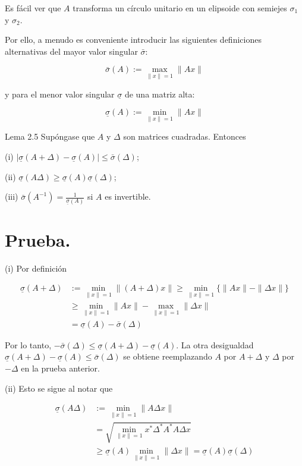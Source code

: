 \documentclass[11pt]{article}
\begin{document}
Es fácil ver que $A$ transforma un círculo unitario en un elipsoide con semiejes $\sigma_{1}$ y $\sigma_{2}$.

Por ello, a menudo es conveniente introducir las siguientes definiciones alternativas del mayor valor singular $\bar{\sigma}$:

$$
\bar{\sigma}(A):=\max _{\|x\|=1}\|A x\|
$$

y para el menor valor singular $\underline{\sigma}$ de una matriz alta:

$$
\underline{\sigma}(A):=\min _{\|x\|=1}\|A x\|
$$

Lema 2.5 Supóngase que $A$ y $\Delta$ son matrices cuadradas. Entonces

(i) $|\underline{\sigma}(A+\Delta)-\underline{\sigma}(A)| \leq \bar{\sigma}(\Delta)$;

(ii) $\underline{\sigma}(A \Delta) \geq \underline{\sigma}(A) \underline{\sigma}(\Delta)$;

(iii) $\bar{\sigma}\left(A^{-1}\right)=\frac{1}{\underline{\sigma}(A)}$ si $A$ es invertible.

\section*{Prueba.}
(i) Por definición

$$
\begin{aligned}
\underline{\sigma}(A+\Delta) & :=\min _{\|x\|=1}\|(A+\Delta) x\| \geq \min _{\|x\|=1}\{\|A x\|-\|\Delta x\|\} \\
& \geq \min _{\|x\|=1}\|A x\|-\max _{\|x\|=1}\|\Delta x\| \\
& =\underline{\sigma}(A)-\bar{\sigma}(\Delta)
\end{aligned}
$$

Por lo tanto, $-\bar{\sigma}(\Delta) \leq \underline{\sigma}(A+\Delta)-\underline{\sigma}(A)$. La otra desigualdad $\underline{\sigma}(A+\Delta)-\underline{\sigma}(A) \leq \bar{\sigma}(\Delta)$ se obtiene reemplazando $A$ por $A+\Delta$ y $\Delta$ por $-\Delta$ en la prueba anterior.

(ii) Esto se sigue al notar que

$$
\begin{aligned}
\underline{\sigma}(A \Delta) & :=\min _{\|x\|=1}\|A \Delta x\| \\
& =\sqrt{\min _{\|x\|=1} x^{*} \Delta^{*} A^{*} A \Delta x} \\
& \geq \underline{\sigma}(A) \min _{\|x\|=1}\|\Delta x\|=\underline{\sigma}(A) \underline{\sigma}(\Delta)
\end{aligned}
$$
\end{document}
